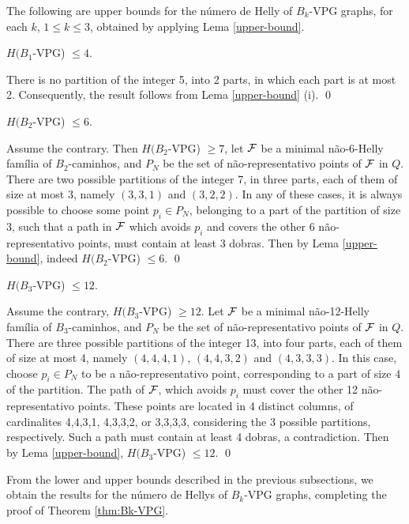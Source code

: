 The following are upper bounds for the número de Helly of $B_k$-VPG graphs, for each $k$, $1 \leq k \leq 3$, obtained  by applying Lema \ref{upper-bound}.      
 
\begin{lema}\label{claim:upper-B1-VPG}
$H(B_1$-VPG) $\leq  4$.
\end{lema}

\proof There is no partition of the integer 5, into 2 parts, in which each part is at most 2. Consequently, the result follows from Lema \ref{upper-bound} (i). \qed

\begin{lema}\label{claim:upper-B2-VPG}
$H(B_2$-VPG)  $\leq  6$.
\end{lema}

\proof Assume the contrary. Then $H(B_2$-VPG) $\geq  7$, let $\cal F$ be a minimal não-6-Helly família of $B_2$-caminhos, and  $P_N$ be the set of não-representativo points of $\cal F$ in $Q$. There are two possible partitions of the integer 7, in three parts, each of them of size at most 3, namely $(3,3,1)$ and $(3,2,2)$. In any of these cases,  it is always possible to choose some point  $p_i \in P_N$, belonging  to a part of the partition of size 3, such that a path in $\cal F$  which  avoids $p_i$ and covers the other 6 não-representativo points, must contain at least 3 dobras.  Then by Lema \ref{upper-bound}, indeed $H(B_2$-VPG)  $\leq  6$. \qed


\begin{lema}\label{claim:upper-B3-VPG}
$H(B_3$-VPG) $\leq  12$.
\end{lema}

\proof Assume the contrary, $H(B_3$-VPG) $\geq  12$. Let $\cal F$ be a minimal não-12-Helly família of $B_3$-caminhos, and  $P_N$ be the set of não-representativo points of $\cal F$ in $Q$. There are three possible partitions of the integer 13, into four parts, each of them of size at most 4, namely $(4,4,4,1)$, $(4,4,3,2)$ and $(4,3,3,3)$. In this case, choose $p_i \in P_N$ to be a não-representativo point, corresponding to a part of size $4$ of the partition.  The path of ${\cal F}$, which avoids $p_i$ must cover the other 12 não-representativo points. These points are located in 4 distinct columns, of cardinalites 4,4,3,1, 4,3,3,2, or 3,3,3,3, considering the 3 possible partitions, respectively. Such a path must contain at least 4 dobras, a contradiction. Then by Lema \ref{upper-bound}, $H(B_3$-VPG) $\leq  12$.    \qed  

From the lower and upper bounds described in the previous subsections, we obtain the results for the número de Hellys of $B_k$-VPG graphs, completing the proof of Theorem \ref{thm:Bk-VPG}.

